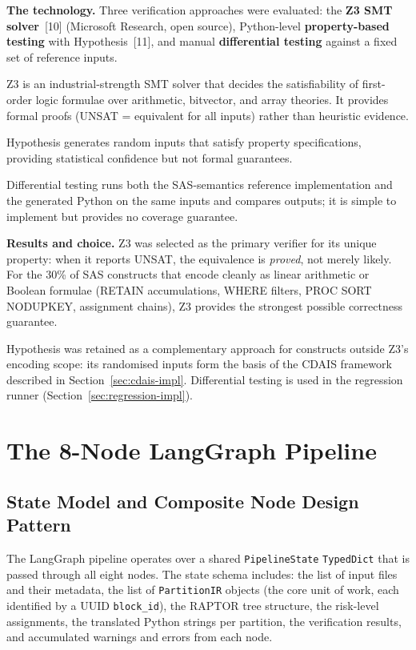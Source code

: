 \textbf{The technology.} Three verification approaches were evaluated: the
\textbf{Z3 SMT solver}~[10] (Microsoft Research, open source), Python-level
\textbf{property-based testing} with Hypothesis~[11], and manual
\textbf{differential testing} against a fixed set of reference inputs.

Z3 is an industrial-strength SMT solver that decides the satisfiability of
first-order logic formulae over arithmetic, bitvector, and array theories.
It provides formal proofs (UNSAT = equivalent for all inputs) rather than
heuristic evidence.

Hypothesis generates random inputs that satisfy property specifications,
providing statistical confidence but not formal guarantees.

Differential testing runs both the SAS-semantics reference implementation and
the generated Python on the same inputs and compares outputs; it is simple to
implement but provides no coverage guarantee.

\textbf{Results and choice.} Z3 was selected as the primary verifier for its
unique property: when it reports UNSAT, the equivalence is \emph{proved}, not
merely likely. For the 30\% of SAS constructs that encode cleanly as linear
arithmetic or Boolean formulae (RETAIN accumulations, WHERE filters, PROC SORT
NODUPKEY, assignment chains), Z3 provides the strongest possible correctness
guarantee.

Hypothesis was retained as a complementary approach for constructs outside Z3's
encoding scope: its randomised inputs form the basis of the CDAIS framework
described in Section~\ref{sec:cdais-impl}. Differential testing is used in the
regression runner (Section~\ref{sec:regression-impl}).

\section{The 8-Node LangGraph Pipeline}
\label{sec:pipeline-design}

\subsection{State Model and Composite Node Design Pattern}
\label{subsec:state-model}

The LangGraph pipeline operates over a shared \texttt{PipelineState}
\texttt{TypedDict} that is passed through all eight nodes. The state schema
includes: the list of input files and their metadata, the list of
\texttt{PartitionIR} objects (the core unit of work, each identified by a UUID
\texttt{block\_id}), the RAPTOR tree structure, the risk-level assignments,
the translated Python strings per partition, the verification results, and
accumulated warnings and errors from each node.

